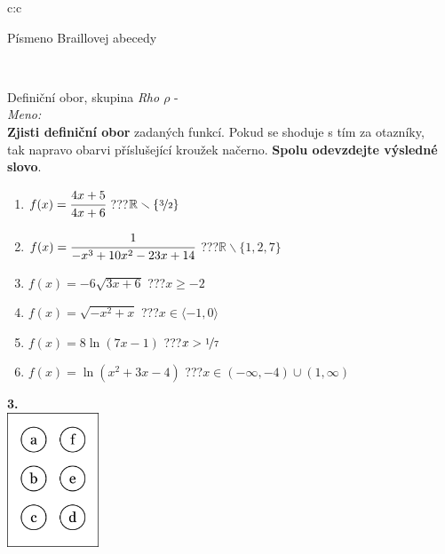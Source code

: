 \documentclass[10pt]{report}
\begin{document}
\begin{tabular}{c:c}
\begin{minipage}[c][99mm][t]{0.49\linewidth}
\begin{center}
\begin{minipage}{0.20\linewidth}
\begin{center}
{\small Písmeno Braillovej abecedy}
\end{center}
\end{minipage}
\end{center}
\end{minipage}
\\ \hdashline
\begin{minipage}[c][99mm][t]{0.49\linewidth}
\begin{center}
\vspace{7mm}
{\huge Definiční obor, skupina \textit{Rho $\rho$} -}\\[4.5mm]
\textit{Meno:}\phantom{xxxxxxxxxxxxxxxxxxxxxxxxxxxxxxxxxxxxxxxxxxxxxxxxxxxxxxxxxxxxxxxxx}\\[3.5mm]
\textbf{Zjisti definiční obor} zadaných funkcí. Pokud se shoduje s tím za otazníky,\\tak napravo obarvi příslušející kroužek načerno. \textbf{Spolu odevzdejte výsledné slovo}.\\[3mm]
\begin{minipage}{0.77\linewidth}
\begin{center}
\begin{varwidth}{\textwidth}
\begin{enumerate}
\normalsize
\item $f(x)=\cfrac{4x+5}{4x+6}$\quad \dotfill\; ???\;\dotfill \quad $\mathbb{R}\smallsetminus\{\nicefrac{3}{2}\}$
\item $f(x)=\cfrac{1}{-x^3+10x^2-23x+14}$\quad \dotfill\; ???\;\dotfill \quad $\mathbb{R}\smallsetminus\{1,2,7\}$
\item $f(x)=-6\sqrt{3x+6}$\quad \dotfill\; ???\;\dotfill \quad $x\geq-2$
\item $f(x)=\sqrt{-x^2+x}$\quad \dotfill\; ???\;\dotfill \quad $x\in\langle-1 , 0\rangle$
\item $f(x)=8\ln{(7x-1)}$\quad \dotfill\; ???\;\dotfill \quad $x>\nicefrac{1}{7}$
\item $f(x)=\ln{(x^2+3x-4)}$\quad \dotfill\; ???\;\dotfill \quad $x\in(-\infty , -4)\cup(1 , \infty)$
\end{enumerate}
\end{varwidth}
\end{center}
\end{minipage}
\begin{minipage}{0.20\linewidth}
\begin{center}
{\Huge\bfseries 3.} \\[2mm]
\includegraphics[height=40mm]{../images/braille.png}

\end{center}
\end{minipage}
\end{center}
\end{minipage}
\end{tabular}
\end{document}
